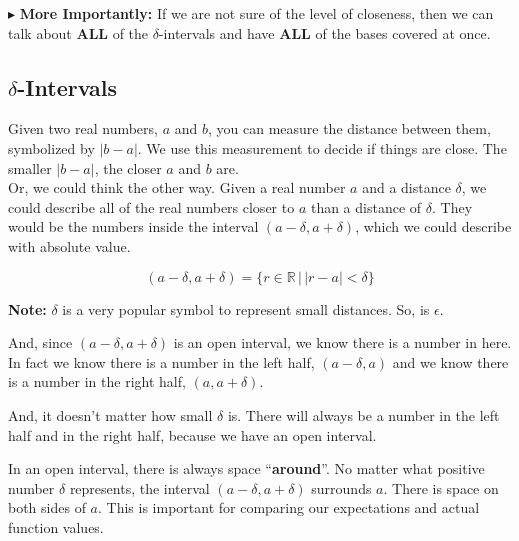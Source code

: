 \documentclass{ximera}
\begin{document}
\textbf{\textcolor{red!90!darkgray}{$\blacktriangleright$}} \textbf{\textcolor{purple!85!blue}{More Importantly:}} If we are not sure of the level of closeness, then we can talk about \textbf{\textcolor{red!80!black}{ALL}} of the $\delta$-intervals and have \textbf{\textcolor{red!80!black}{ALL}} of the bases covered at once.










\subsection{$\delta$-Intervals}



Given two real numbers, $a$ and $b$, you can measure the distance between them, symbolized by $|b-a|$.  We use this measurement to decide if things are close.  The smaller $|b-a|$, the closer $a$ and $b$ are. \\



Or, we could think the other way.  Given a real number $a$ and a distance $\delta$, we could describe all of the real numbers closer to $a$ than a distance of $\delta$.  They would be the numbers inside the interval $(a-\delta, a+\delta)$, which we could describe with absolute value.

\[      (a-\delta, a+\delta) = \{ r \in \mathbb{R} \, | \, |r - a| < \delta        \}       \]


\textbf{Note:}  $\delta$ is a very popular symbol to represent small distances.  So, is $\epsilon$.



And, since $(a-\delta, a+\delta)$ is an open interval, we know there is a number in here.  In fact we know there is a number in the left half, $(a-\delta, a)$ and we know there is a number in the right half, $(a, a+\delta)$.


And, it doesn't matter how small $\delta$ is.  There will always be a number in the left half and in the right half, because we have an open interval.


In an open interval, there is always space ``\textbf{\textcolor{purple!85!blue}{around}}''.  No matter what positive number $\delta$ represents, the interval $(a-\delta, a+\delta)$ surrounds $a$.  There is space on both sides of $a$. This is important for comparing our expectations and actual function values.
\end{document}
